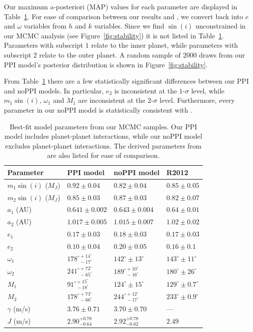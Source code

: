 Our maximum a-posteriori (MAP) values for each parameter are displayed in Table~\ref{tab:MCMC}. 
For ease of comparison between our results and \R, we convert back into $e$ and $\omega$ variables from $h$ and $k$ variables.
Since we find $\sin(i)$ unconstrained in our MCMC analysis (see Figure~\ref{fig:stability}) it is not listed in Table~\ref{tab:MCMC}.
Parameters with subscript $1$ relate to the inner planet, while parameters with subscript $2$ relate to the outer planet. 
A random sample of 2000 draws from our PPI model's posterior distribution is shown in Figure~\ref{fig:stability}.

From Table~\ref{tab:MCMC} there are a few statistically significant differences between our PPI and noPPI models. 
In particular, $e_2$ is inconsistent at the $1$-$\sigma$ level, while $m_1\sin(i)$, $\omega_1$ and $M_1$ are inconsistent at the $2$-$\sigma$ level.
Furthermore, every parameter in our noPPI model is statistically consistent with \R.

\begin{table}
\begin{tabular}{llll}
\hline \hline
Parameter & PPI model & noPPI model & R2012\\ 
 \hline \hline
 $m_1\sin(i)$ ($M_J$) & $0.92 \pm 0.04$ & $0.82 \pm 0.04$ & $0.85 \pm 0.05$ \\ 
 $m_2\sin(i)$ ($M_J$) & $0.85 \pm 0.03$ & $0.87 \pm 0.03$ & $0.82 \pm 0.07$ \\ 
 $a_1$ (AU) & $0.641 \pm 0.002$ & $0.643 \pm 0.004$ & $0.64 \pm 0.01$ \\
 $a_2$ (AU) & $1.017 \pm 0.005$ & $1.015 \pm 0.007$ & $1.02 \pm 0.02$\\
 $e_1$ & $0.17 \pm 0.03$ & $0.18 \pm 0.03$ & $0.17 \pm 0.03$\\
 $e_2$ & $0.10 \pm 0.04$ & $0.20 \pm 0.05$ & $0.16 \pm 0.1$\\
 $\omega_1$ & $178^{\circ +14^{\circ}}_{\ \ -17^{\circ}}$ & $142^{\circ} \pm 13^{\circ}$ & $143^{\circ} \pm 11^{\circ}$\\
 $\omega_2$ & $241^{\circ +72^{\circ}}_{\ \ -65^{\circ}}$ & $189^{\circ +10^{\circ}}_{\ \ -16^{\circ}}$ & $180^{\circ} \pm 26^{\circ}$\\
 $M_1$ & $91^{\circ +15^{\circ}}_{\ \ -18^{\circ}}$ & $124^{\circ} \pm 15^{\circ}$ & $129^{\circ} \pm 0.7^{\circ}$\\
 $M_2$ & $178^{\circ +73^{\circ}}_{\ \ -66^{\circ}}$ & $244^{\circ +12^{\circ}}_{\ \ -17^{\circ}}$ & $233^{\circ} \pm 0.9^{\circ}$\\
 $\gamma$ (m/s) & $3.76 \pm 0.71$ & $3.70 \pm 0.70$ & --- \\
 $J$ (m/s) & $2.90^{+0.78}_{-0.64}$ & $2.92^{+0.78}_{-0.62}$ & $2.49$\\
 \hline
\end{tabular}
\caption{Best-fit model parameters from our MCMC samples. Our PPI model includes planet-planet interactions, while our noPPI model excludes planet-planet interactions. The derived parameters from \R are also listed for ease of comparison.}
\label{tab:MCMC}
\end{table}

